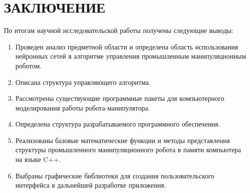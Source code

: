 \newpage
\section*{ЗАКЛЮЧЕНИЕ}


По итогам научной исследовательской работы получены следующие выводы: 
\begin{enumerate}

\item Проведен анализ предметной области и определена область использования нейронных сетей в алгоритме управления промышленным манипуляционным роботом.
\item Описана структура управляющего алгоритма.
\item Рассмотрены существующие программные пакеты для компьютерного моделирования работы робота-манипулятора.
\item Определена структура разрабатываемого программного обеспечения.
\item Реализованы базовые математические функции и методы представления структуры промышленного манипуляционного робота в памяти компьютера на языке C++.
\item Выбраны графические библиотеки для создания пользовательского интерфейса в дальнейшей разработке приложения.

\end{enumerate}
